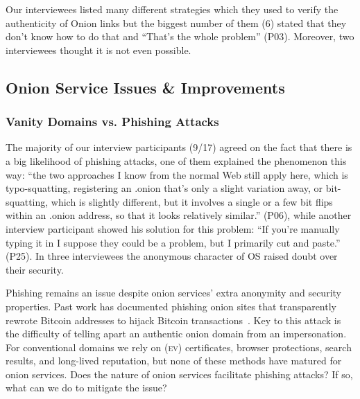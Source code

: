 Our interviewees listed many different strategies which they used to verify the
authenticity of Onion links but the biggest number of them (6) stated that they
don't know how to do that and ``That's the whole problem'' (P03). Moreover, two
interviewees thought it is not even possible.

\subsection{Onion Service Issues \& Improvements}
\label{sec:improve}

\subsubsection{Vanity Domains vs. Phishing Attacks}

The majority of our interview participants (9/17) agreed on the fact that there
is a big likelihood of phishing attacks, one of them explained the phenomenon
this way: ``the two approaches I know from the normal Web still apply here,
which is typo-squatting, registering an .onion that's only a slight variation
away, or bit-squatting, which is slightly different, but it involves a single or
a few bit flips within an .onion address, so that it looks relatively similar.''
(P06), while another interview participant showed his solution for this problem:
``If you're manually typing it in I suppose they could be a problem, but I
primarily cut and paste.'' (P25). In three interviewees the anonymous character
of OS raised doubt over their security.

Phishing remains an issue despite onion services' extra anonymity and security
properties.  Past work has documented phishing onion sites that transparently
rewrote Bitcoin addresses to hijack Bitcoin
transactions~\cite{Winter2016a,Nurmi2015a,Monteiro2016a}.  Key to this attack is
the difficulty of telling apart an authentic onion domain from an impersonation.
For conventional domains we rely on (\textsc{ev}) certificates, browser
protections, search results, and long-lived reputation, but none of these
methods have matured for onion services.  Does the nature of onion services
facilitate phishing attacks?  If so, what can we do to mitigate the issue?

